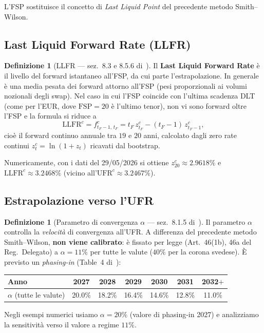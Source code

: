 \documentclass[11pt,a4paper]{article}
\theoremstyle{plain}
\theoremstyle{definition}
\newtheorem{definizione}[teorema]{Definizione}
\theoremstyle{remark}
\newcommand{\UFR}{\mathrm{UFR}}
\newcommand{\LLFR}{\mathrm{LLFR}}
\newcommand{\FSP}{\mathrm{FSP}}
\begin{document}
L'FSP sostituisce il concetto di \emph{Last Liquid Point} del precedente metodo
Smith--Wilson.

\subsection{Last Liquid Forward Rate (LLFR)}

\begin{definizione}[LLFR --- sez.~8.3 e 8.5.6 di~\cite{eiopa2026}]
Il \textbf{Last Liquid Forward Rate} \`e il livello del forward istantaneo all'FSP, da
cui parte l'estrapolazione. In generale \`e una media pesata dei forward attorno
all'FSP (pesi proporzionali ai volumi nozionali degli swap). Nel caso in cui l'FSP
coincide con l'ultima scadenza DLT (come per l'EUR, dove $\FSP=20$ \`e l'ultimo tenor),
non vi sono forward oltre l'FSP e la formula si riduce a
\begin{equation}
  \label{eq:llfr}
  \LLFR^c = f^c_{t_F-1,\,t_F} = t_F\,z^c_{t_F} - (t_F-1)\,z^c_{t_F-1},
\end{equation}
cio\`e il forward continuo annuale tra $19$ e $20$ anni, calcolato dagli zero rate
continui $z^c_t = \ln(1+z_t)$ ricavati dal bootstrap.
\end{definizione}

Numericamente, con i dati del 29/05/2026 si ottiene $z^c_{20} \approx 2.9618\%$ e
$\LLFR^c \approx 3.2468\%$ (vicino all'$\UFR^c \approx 3.2467\%$).

\subsection{Estrapolazione verso l'UFR}

\begin{definizione}[Parametro di convergenza $\alpha$ --- sez.~8.1.5 di~\cite{eiopa2026}]
Il parametro $\alpha$ controlla la \emph{velocit\`a} di convergenza all'UFR. A
differenza del precedente metodo Smith--Wilson, \textbf{non viene calibrato}: \`e fissato
per legge (Art.~46(1b), 46a del Reg.~Delegato) a $\alpha = 11\%$ per tutte le valute
($40\%$ per la corona svedese). \`E previsto un \emph{phasing-in} (Table~4
di~\cite{eiopa2026}):
\begin{center}\small
\renewcommand{\arraystretch}{1.15}
\begin{tabular}{lcccccc}
\toprule
Anno & 2027 & 2028 & 2029 & 2030 & 2031 & 2032$+$\\
\midrule
$\alpha$ (tutte le valute) & 20.0\% & 18.2\% & 16.4\% & 14.6\% & 12.8\% & 11.0\%\\
\bottomrule
\end{tabular}
\end{center}
Negli esempi numerici usiamo $\alpha = 20\%$ (valore di phasing-in 2027) e analizziamo
la sensitivit\`a verso il valore a regime $11\%$.
\end{definizione}
\end{document}
